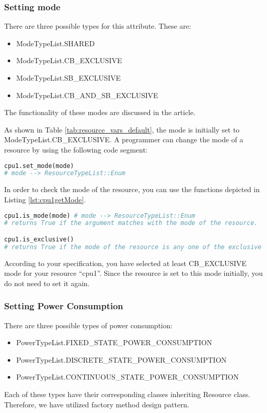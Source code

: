 \documentclass[]{scrartcl}
\begin{document}
\subsubsection{Setting mode}
There are three possible types for this attribute. These are:
\begin{itemize}
    \item \textsf{ModeTypeList.SHARED}
    \item \textsf{ModeTypeList.CB\_EXCLUSIVE}
    \item \textsf{ModeTypeList.SB\_EXCLUSIVE}
    \item \textsf{ModeTypeList.CB\_AND\_SB\_EXCLUSIVE}
\end{itemize}
The functionality of these modes are discussed in the article.

As shown in Table \ref{tab:resource_vars_default}, the mode is initially set to \textsf{ModeTypeList.CB\_EXCLUSIVE}. A programmer can change the mode of a resource by using the following code segment:

\begin{lstlisting}[language=Python, frame=single, label={lst:cpu1setMode}, caption={Setting the mode of a resource after creating a resource.}]
cpu1.set_mode(mode)
# mode --> ResourceTypeList::Enum
\end{lstlisting}
        

In order to check the mode of the resource, you can use the functions depicted in Listing \ref{lst:cpu1getMode}.

\begin{lstlisting}[language=Python, frame=single, label={lst:cpu1getMode}, caption={The functions for resource mode check.}]
cpu1.is_mode(mode) # mode --> ResourceTypeList::Enum
# returns True if the argument matches with the mode of the resource.

cpu1.is_exclusive()
# returns True if the mode of the resource is any one of the exclusive mode.
\end{lstlisting}
        
        
According to your specification, you have selected at least \textsf{CB\_EXCLUSIVE} mode for your resource ``cpu1''. Since the resource is set to this mode initially, you do not need to set it again.
        
\subsubsection{Setting Power Consumption}
There are three possible types of power consumption:
\begin{itemize}
    \item \textsf{PowerTypeList.FIXED\_STATE\_POWER\_CONSUMPTION}
    \item \textsf{PowerTypeList.DISCRETE\_STATE\_POWER\_CONSUMPTION}
    \item \textsf{PowerTypeList.CONTINUOUS\_STATE\_POWER\_CONSUMPTION}
\end{itemize}
Each of these types have their corresponding classes inheriting \textsf{Resource} class. Therefore, we have utilized factory method design pattern.
        
\end{document}
